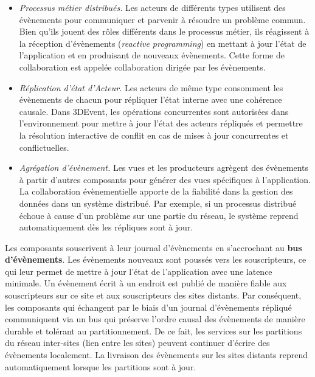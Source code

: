 \begin{itemize}
	\item \textit{Processus métier distribués.} Les acteurs de différents types 
	utilisent des évènements pour communiquer et parvenir à résoudre un problème 
	commun. Bien qu'ils jouent des rôles différents dans le processus métier, ils 
	réagissent à la réception d'évènements (\textit{reactive programming}) en 
	mettant à jour l'état de l'application et en produisant de nouveaux évènements. 
	Cette forme de collaboration est appelée collaboration dirigée par les 
	évènements.
	\item\textit{Réplication d'état d'Acteur.} Les acteurs de même type consomment 
	les évènements de chacun pour répliquer l'état interne avec une cohérence 
	causale. Dans 3DEvent, les opérations concurrentes sont autorisées dans 
	l'environnement pour mettre à jour l'état des acteurs répliqués et permettre la 
	résolution interactive de conflit en cas de mises à jour concurrentes et 
	conflictuelles. 
	\item \textit{Agrégation d'évènement.} Les vues et les producteurs agrègent des 
	évènements à partir d'autres composants pour générer des vues spécifiques à 
	l'application.
	La collaboration évènementielle apporte de la fiabilité dans la gestion des 
	données dans un système distribué. Par exemple, si un processus distribué 
	échoue à cause d'un problème sur une partie du réseau, le système reprend 
	automatiquement dès les répliques sont à jour.
\end{itemize}

Les composants souscrivent à leur journal d'évènements en s'accrochant au 
\textbf{bus d'évènements}.
Les évènements nouveaux sont poussés vers les souscripteurs, 
ce qui leur permet de mettre à jour l'état de l'application avec une latence 
minimale. 
Un évènement écrit à un endroit est publié de manière fiable aux souscripteurs sur 
ce site et aux souscripteurs des sites distants. 
Par conséquent, les composants qui échangent par le biais d'un 
journal d'évènements répliqué communiquent via un bus qui préserve l'ordre causal 
des évènements de manière durable et tolérant au partitionnement. De ce fait, les 
services sur les partitions du réseau inter-sites (lien entre les sites) peuvent 
continuer d'écrire des évènements localement. La livraison des évènements sur 
les sites distants reprend automatiquement lorsque les partitions sont à jour.


